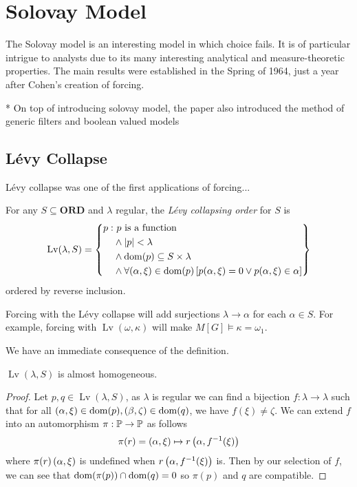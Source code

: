\chapter{Solovay Model}

The Solovay model is an interesting model in which choice fails.
It is of particular intrigue to analysts due to its many interesting analytical and measure-theoretic properties.
The main results were established in the Spring of 1964, just a year after Cohen's creation of forcing.

* On top of introducing solovay model, the paper also introduced the method of generic filters and boolean valued models

\section{Lévy Collapse}

Lévy collapse was one of the first applications of forcing...

\newcommand*{\Lv}{\operatorname{Lv}}
\begin{definition}
    For any \(S\subseteq \mathbf{ORD}\) and \(\lambda\) regular, the \emph{Lévy collapsing order} for \(S\) is
    \[
        \Lv(\lambda, S) = \set{
            \begin{split}
                p: &\ p\text{ is a function} \\
                   &\land \abs{p} < \lambda \\
                   &\land \dom(p) \subseteq S\times\lambda \\
                   &\land \forall (\alpha,\xi)\in\dom(p)\sq{p(\alpha,\xi) = 0 \lor p(\alpha,\xi)\in \alpha}
            \end{split}
        }
    \]
    ordered by reverse inclusion.
\end{definition}
\begin{remark}
    Forcing with the Lévy collapse will add surjections \(\lambda\to\alpha\) for each \(\alpha\in S\).
    For example, forcing with \(\Lv(\omega,\kappa)\) will make \(M[G]\models \kappa = \omega_1\).
\end{remark}

We have an immediate consequence of the definition.
\begin{proposition}
    \(\Lv(\lambda,S)\) is almost homogeneous.
\end{proposition}
\begin{proof}
    Let \(p,q\in\Lv(\lambda,S)\), as \(\lambda\) is regular we can find a bijection \(f:\lambda\to\lambda\) such that
    for all \((\alpha,\xi)\in\dom(p), (\beta,\zeta)\in\dom(q)\), we have \(f(\xi) \ne \zeta\).
    We can extend \(f\) into an automorphism \(\pi:\P\to\P\) as follows
    \[ \pi(r) = \paren{\alpha,\xi}\mapsto r\paren{\alpha, f^{-1}(\xi)} \]
    where \(\pi(r)\paren{\alpha,\xi}\) is undefined when \(r\paren{\alpha,f^{-1}(\xi)}\) is.
    Then by our selection of \(f\), we can see that \(\dom(\pi(p)) \cap\dom(q) = 0\) so \(\pi(p)\) and \(q\) are compatible.
\end{proof}

